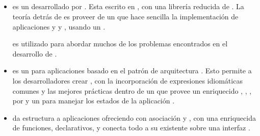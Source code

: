 \subsection{\clientSideAS}
	\begin{itemize}
		\item 
			\textbf{\angularjsNAME} es un \frameworkPC \clientSideAS desarrollado por \googleNAME. Esta escrito en \javaScriptNAME, con una librería reducida de \jqueryNAME. La teoría detrás de \angularjsNAME es proveer de un \frameworkPC que hace sencilla la implementación de aplicaciones y \webPageINT \wellDesignQA y \structuredQA, usando un \frameworkPC \mvcAS \cite{book_technology_node_mongo_angular_development}. 

			\angularjsNAME es utilizado para abordar muchos de los problemas encontrados en el desarrollo de \singlePageAppINT \cite{technology_angularjs}.

		\item 
			\textbf{\emberjsName \cite{online_technology_emberjs}} es un \frameworkPC \openSourcePC \clientSideAS \javaScriptNAME para aplicaciones \webINT basado en el patrón de arquitectura \mvcAS. Esto permite a los desarrolladores crear \singlePageAppINT \scalablesQA \cite{online_Enterprise_Moving_SinglePage_Design}, con la incorporación de expresiones idiomáticas comunes y las mejores prácticas dentro de un  \frameworkPC que provee un enriquecido \objectModelPL, \dataBindingPL \declarativePL \twoWayINT, \computedPropEmberAS, \templatesAS \autoUpdatedAS \poweredCPT por \handlebarsNAME y un \routerPC para manejar los estados de la aplicación \cite{online_technology_emberjs_getting_into}.

		\item
			\textbf{\backbonejsNAME} da estructura a aplicaciones \webINT ofreciendo \textbf{\modelsCustom} con asociación \keyValue y \events \custom, \textbf{\collectionsDB} con una \api enriquecida de funciones, \textbf{\views} \handling \event declarativos, y conecta todo a su \api existente sobre una interfaz \json \restful \cite{online_technology_backbone}.
		


\end{itemize}
